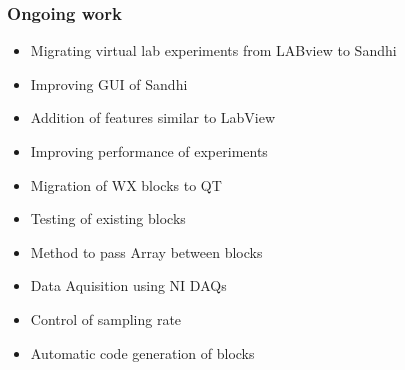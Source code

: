 \documentclass{beamer}
\begin{document}
\begin{frame}
\frametitle{Ongoing work}
\begin{itemize}
\item Migrating virtual lab experiments from LABview to Sandhi
\item Improving GUI of Sandhi
\item Addition of features similar to LabView
\item Improving performance of experiments
\item Migration of WX blocks to QT
\item Testing of existing blocks
\item Method to pass Array between blocks
\item Data Aquisition using NI DAQs
\item Control of sampling rate
\item Automatic code generation of blocks
\end{itemize}
\end{frame}
\end{document}
